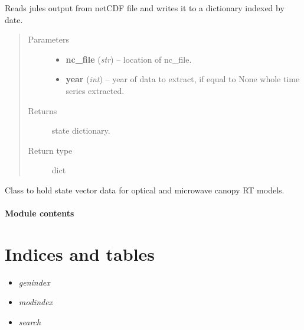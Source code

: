 \documentclass[letterpaper,10pt,english]{sphinxmanual}
\begin{document}
\begin{fulllineitems}
\label{source/sentinelSimulator:sentinelSimulator.stateVector.read_jules}
Reads jules output from netCDF file and writes it to a dictionary indexed by date.
\begin{quote}\begin{description}
\item[{Parameters}] \leavevmode\begin{itemize}
\item {} 
\textbf{nc\_file} (\emph{str}) -- location of nc\_file.

\item {} 
\textbf{year} (\emph{int}) -- year of data to extract, if equal to None whole time series extracted.

\end{itemize}

\item[{Returns}] \leavevmode
state dictionary.

\item[{Return type}] \leavevmode
dict

\end{description}\end{quote}

\end{fulllineitems}


\begin{fulllineitems}
\label{source/sentinelSimulator:sentinelSimulator.stateVector.stateVector}
Class to hold state vector data for optical
and microwave canopy RT models.

\end{fulllineitems}



\subsubsection{Module contents}
\label{source/sentinelSimulator:module-sentinelSimulator}\label{source/sentinelSimulator:module-contents}

\chapter{Indices and tables}
\label{index:indices-and-tables}\begin{itemize}
\item {} 
\emph{genindex}

\item {} 
\emph{modindex}

\item {} 
\emph{search}

\end{itemize}
\end{document}
